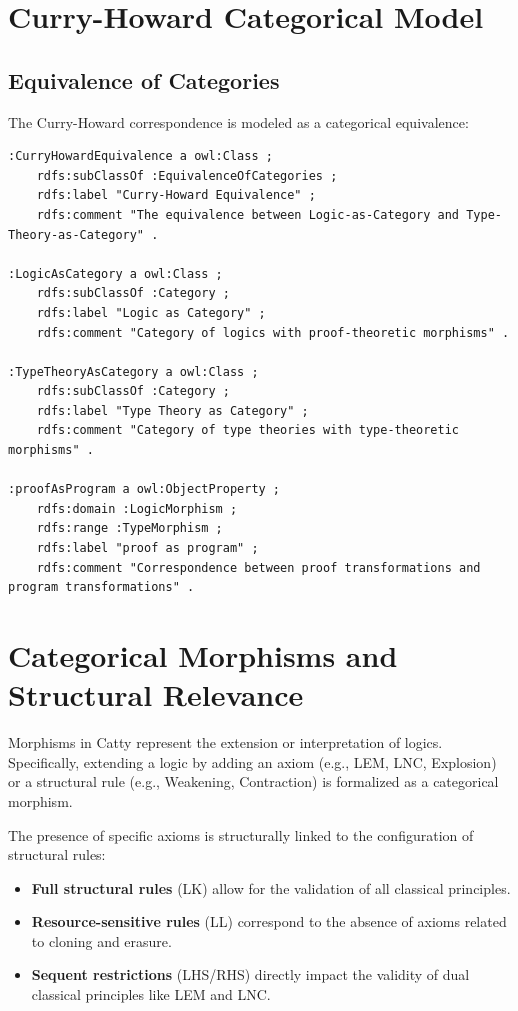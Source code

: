 \section{Curry-Howard Categorical Model}

\subsection{Equivalence of Categories}

The Curry-Howard correspondence is modeled as a categorical equivalence:

\begin{verbatim}
:CurryHowardEquivalence a owl:Class ;
    rdfs:subClassOf :EquivalenceOfCategories ;
    rdfs:label "Curry-Howard Equivalence" ;
    rdfs:comment "The equivalence between Logic-as-Category and Type-Theory-as-Category" .

:LogicAsCategory a owl:Class ;
    rdfs:subClassOf :Category ;
    rdfs:label "Logic as Category" ;
    rdfs:comment "Category of logics with proof-theoretic morphisms" .

:TypeTheoryAsCategory a owl:Class ;
    rdfs:subClassOf :Category ;
    rdfs:label "Type Theory as Category" ;
    rdfs:comment "Category of type theories with type-theoretic morphisms" .

:proofAsProgram a owl:ObjectProperty ;
    rdfs:domain :LogicMorphism ;
    rdfs:range :TypeMorphism ;
    rdfs:label "proof as program" ;
    rdfs:comment "Correspondence between proof transformations and program transformations" .
\end{verbatim}

\section{Categorical Morphisms and Structural Relevance}

Morphisms in Catty represent the extension or interpretation of logics. Specifically, extending a logic by adding an axiom (e.g., LEM, LNC, Explosion) or a structural rule (e.g., Weakening, Contraction) is formalized as a categorical morphism.

The presence of specific axioms is structurally linked to the configuration of structural rules:
\begin{itemize}
  \item \textbf{Full structural rules} (LK) allow for the validation of all classical principles.
  \item \textbf{Resource-sensitive rules} (LL) correspond to the absence of axioms related to cloning and erasure.
  \item \textbf{Sequent restrictions} (LHS/RHS) directly impact the validity of dual classical principles like LEM and LNC.
\end{itemize}

